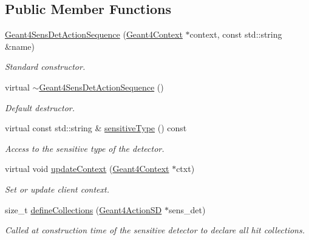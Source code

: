 \subsection*{Public Member Functions}
\begin{DoxyCompactItemize}
\item 
\hyperlink{class_d_d4hep_1_1_simulation_1_1_geant4_sens_det_action_sequence_a6930930d7fb224b53979dd6decc4907b}{Geant4SensDetActionSequence} (\hyperlink{class_d_d4hep_1_1_simulation_1_1_geant4_context}{Geant4Context} $\ast$context, const std::string \&name)
\begin{DoxyCompactList}\small\item\em Standard constructor. \item\end{DoxyCompactList}\item 
virtual \hyperlink{class_d_d4hep_1_1_simulation_1_1_geant4_sens_det_action_sequence_a0e8473bdb136ab4eae734fd3305b4f05}{$\sim$Geant4SensDetActionSequence} ()
\begin{DoxyCompactList}\small\item\em Default destructor. \item\end{DoxyCompactList}\item 
virtual const std::string \& \hyperlink{class_d_d4hep_1_1_simulation_1_1_geant4_sens_det_action_sequence_a6532bc350702a2c13bd15e6450e525c5}{sensitiveType} () const 
\begin{DoxyCompactList}\small\item\em Access to the sensitive type of the detector. \item\end{DoxyCompactList}\item 
virtual void \hyperlink{class_d_d4hep_1_1_simulation_1_1_geant4_sens_det_action_sequence_a5878271f8da03d02bf4b3b8145246775}{updateContext} (\hyperlink{class_d_d4hep_1_1_simulation_1_1_geant4_context}{Geant4Context} $\ast$ctxt)
\begin{DoxyCompactList}\small\item\em Set or update client context. \item\end{DoxyCompactList}\item 
size\_\-t \hyperlink{class_d_d4hep_1_1_simulation_1_1_geant4_sens_det_action_sequence_a6b123f2232b47f787478fd744898ab0e}{defineCollections} (\hyperlink{class_d_d4hep_1_1_simulation_1_1_geant4_action_s_d}{Geant4ActionSD} $\ast$sens\_\-det)
\begin{DoxyCompactList}\small\item\em Called at construction time of the sensitive detector to declare all hit collections. \item\end{DoxyCompactList}\item 

\end{DoxyCompactItemize}
